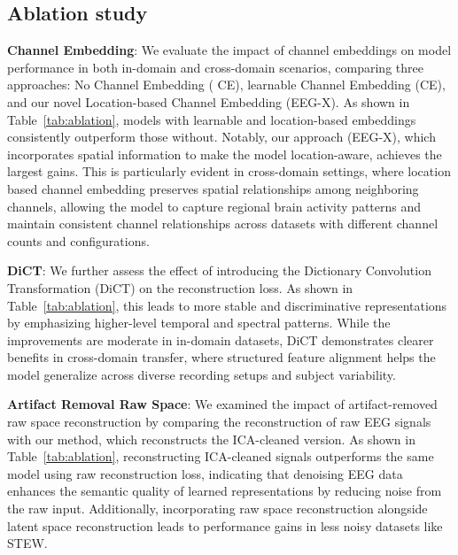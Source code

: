 \documentclass{article} %
\begin{document}
\subsection{Ablation study}
\textbf{Channel Embedding}:
We evaluate the impact of channel embeddings on model performance in both in-domain and cross-domain scenarios, comparing three approaches: No Channel Embedding ( CE), learnable Channel Embedding (CE), and our novel Location-based Channel Embedding (EEG-X). As shown in Table~\ref{tab:ablation}, models with learnable and location-based embeddings consistently outperform those without. Notably, our approach (EEG-X), which incorporates spatial information to make the model location-aware, achieves the largest gains. This is particularly evident in cross-domain settings, where location based channel embedding preserves spatial relationships among neighboring channels, allowing the model to capture regional brain activity patterns and maintain consistent channel relationships across datasets with different channel counts and configurations.

\textbf{DiCT}: We further assess the effect of introducing the Dictionary Convolution Transformation (DiCT) on the reconstruction loss. As shown in Table~\ref{tab:ablation}, this leads to more stable and discriminative representations by emphasizing higher-level temporal and spectral patterns. While the improvements are moderate in in-domain datasets, DiCT demonstrates clearer benefits in cross-domain transfer, where structured feature alignment helps the model generalize across diverse recording setups and subject variability.

\textbf{Artifact Removal Raw Space}:
We examined the impact of artifact-removed raw space reconstruction by comparing the reconstruction of raw EEG signals with our method, which reconstructs the ICA-cleaned version. As shown in Table~\ref{tab:ablation}, reconstructing ICA-cleaned signals outperforms the same model using raw reconstruction loss, indicating that denoising EEG data enhances the semantic quality of learned representations by reducing noise from the raw input. Additionally, incorporating raw space reconstruction alongside latent space reconstruction leads to performance gains in less noisy datasets like STEW.
\end{document}
